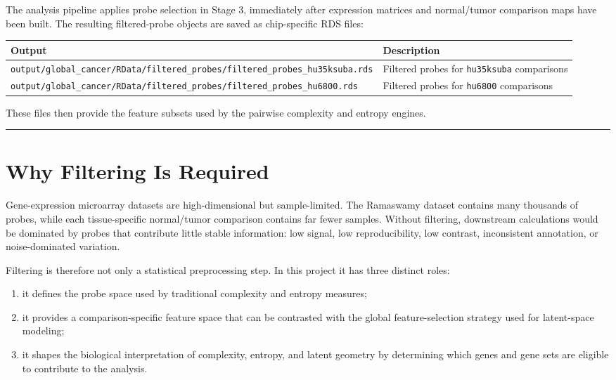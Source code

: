 \documentclass[
  letterpaper,
  DIV=11,
  numbers=noendperiod,
  openany,
  oneside]{scrreprt}
\providecommand{\tightlist}{%
  \setlength{\itemsep}{0pt}\setlength{\parskip}{0pt}}
\begin{document}
The analysis pipeline applies probe selection in Stage 3, immediately
after expression matrices and normal/tumor comparison maps have been
built. The resulting filtered-probe objects are saved as chip-specific
RDS files:

\begin{longtable}[]{@{}
  >{\raggedright\arraybackslash}p{}
  >{\raggedright\arraybackslash}p{}@{}}
\toprule\noalign{}
\begin{minipage}[b]{\linewidth}\raggedright
Output
\end{minipage} & \begin{minipage}[b]{\linewidth}\raggedright
Description
\end{minipage} \\
\midrule\noalign{}
\endhead
\bottomrule\noalign{}
\endlastfoot
\texttt{output/global\_cancer/RData/filtered\_probes/filtered\_probes\_hu35ksuba.rds}
& Filtered probes for \texttt{hu35ksuba} comparisons \\
\texttt{output/global\_cancer/RData/filtered\_probes/filtered\_probes\_hu6800.rds}
& Filtered probes for \texttt{hu6800} comparisons \\
\end{longtable}

These files then provide the feature subsets used by the pairwise
complexity and entropy engines.

\begin{center}\rule{0.5\linewidth}{0.5pt}\end{center}

\section{Why Filtering Is Required}\label{why-filtering-is-required}

Gene-expression microarray datasets are high-dimensional but
sample-limited. The Ramaswamy dataset contains many thousands of probes,
while each tissue-specific normal/tumor comparison contains far fewer
samples. Without filtering, downstream calculations would be dominated
by probes that contribute little stable information: low signal, low
reproducibility, low contrast, inconsistent annotation, or
noise-dominated variation.

Filtering is therefore not only a statistical preprocessing step. In
this project it has three distinct roles:

\begin{enumerate}
\def\labelenumi{\arabic{enumi}.}
\tightlist
\item
  it defines the probe space used by traditional complexity and entropy
  measures;
\item
  it provides a comparison-specific feature space that can be contrasted
  with the global feature-selection strategy used for latent-space
  modeling;
\item
  it shapes the biological interpretation of complexity, entropy, and
  latent geometry by determining which genes and gene sets are eligible
  to contribute to the analysis.
\end{enumerate}
\end{document}
